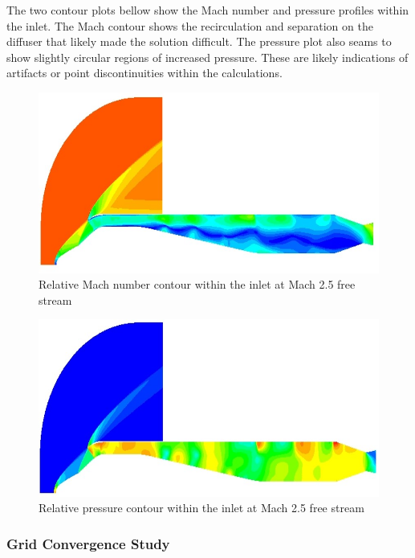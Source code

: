 The two contour plots bellow show the Mach number and pressure profiles within the inlet. The Mach contour shows the recirculation and separation on the diffuser that likely made the solution difficult. The pressure plot also seams to show slightly circular regions of increased pressure. These are likely indications of artifacts or point discontinuities within the calculations.

\begin{figure}[H]
\centering
\includegraphics[width=1.0\textwidth]{JWE_Figures/Critical_Mach_2_5.jpg}
\caption{Relative Mach number contour within the inlet at Mach 2.5 free stream}
\label{fig:InletMach}
\end{figure}

\begin{figure}[H]
\centering
\includegraphics[width=1.0\textwidth]{JWE_Figures/Critical_Mach_2_5_Pressure.jpg}
\caption{Relative pressure contour within the inlet at Mach 2.5 free stream}
\label{fig:InletPSI}
\end{figure}

\subsubsection{Grid Convergence Study}

